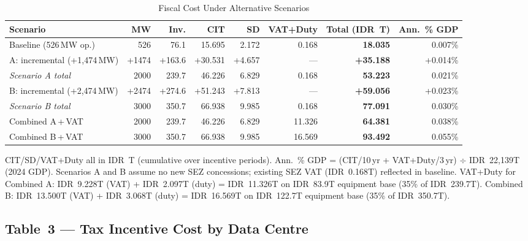 \documentclass[11pt,english]{article}
\begin{document}
\begin{table}[H]
\centering
\caption{Fiscal Cost Under Alternative Scenarios}
\label{tab:scenarios}
\begin{threeparttable}
\small
\begin{tabular}{l r r r r r r r}
\toprule
\textbf{Scenario} & \textbf{MW} & \textbf{Inv.} & \textbf{CIT} & \textbf{SD} & \textbf{VAT+Duty} & \textbf{Total (IDR~T)} & \textbf{Ann.\ \% GDP} \\
\midrule
  Baseline (526\,MW op.) & 526 & 76.1 & 15.695 & 2.172 & 0.168 & \textbf{18.035} & 0.007\% \\
  A: incremental (+1{,}474\,MW) & +1474 & +163.6 & +30.531 & +4.657 & --- & \textbf{+35.188} & +0.014\% \\
  \quad\textit{Scenario A total} & 2000 & 239.7 & 46.226 & 6.829 & 0.168 & \textbf{53.223} & 0.021\% \\
  B: incremental (+2{,}474\,MW) & +2474 & +274.6 & +51.243 & +7.813 & --- & \textbf{+59.056} & +0.023\% \\
  \quad\textit{Scenario B total} & 3000 & 350.7 & 66.938 & 9.985 & 0.168 & \textbf{77.091} & 0.030\% \\
  \midrule
  Combined A\,+\,VAT & 2000 & 239.7 & 46.226 & 6.829 & 11.326 & \textbf{64.381} & 0.038\% \\
  Combined B\,+\,VAT & 3000 & 350.7 & 66.938 & 9.985 & 16.569 & \textbf{93.492} & 0.055\% \\
\bottomrule
\end{tabular}
\begin{tablenotes}
\small
\item CIT/SD/VAT+Duty all in IDR~T (cumulative over incentive periods). Ann.\ \% GDP = (CIT/10\,yr + VAT+Duty/3\,yr) $\div$ IDR~22{,}139T (2024 GDP). Scenarios A and B assume no new SEZ concessions; existing SEZ VAT (IDR~0.168T) reflected in baseline. VAT+Duty for Combined A: IDR~9.228T (VAT) + IDR~2.097T (duty) = IDR~11.326T on IDR~83.9T equipment base (35\% of IDR~239.7T). Combined B: IDR~13.500T (VAT) + IDR~3.068T (duty) = IDR~16.569T on IDR~122.7T equipment base (35\% of IDR~350.7T).
\end{tablenotes}
\end{threeparttable}
\end{table}
\subsection*{Table~3 \texorpdfstring{---}{--} Tax Incentive Cost by Data Centre}
\end{document}
